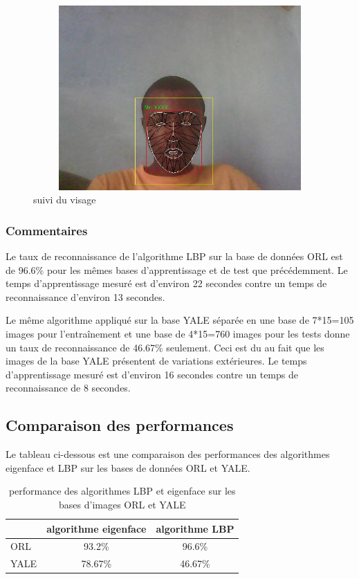 \begin{enumerate}
	\begin{figure}[htbp]
		\centering
			\includegraphics[width=350pt,height=200pt]{track3.JPG}
		\caption{suivi du visage}
		\label{fig:track 1}
	\end{figure}
	\end{enumerate}
	
	
	
		\subsubsection{Commentaires}
	Le taux de reconnaissance de l'algorithme LBP sur la base de données ORL est de 96.6\% pour les mêmes bases d'apprentissage et de test que précédemment. Le temps d'apprentissage mesuré est d'environ 22 secondes contre un temps de reconnaissance d'environ 13 secondes. 
	
	Le même algorithme appliqué sur la base YALE séparée en une base de 7*15=105 images pour l'entraînement et une base de 4*15=760 images pour les tests donne un taux de reconnaissance de 46.67\% seulement. Ceci est du au fait que les images de la base YALE présentent de variations extérieures. Le temps d'apprentissage mesuré est d'environ 16 secondes contre un temps de reconnaissance de 8 secondes. 
	\subsection{Comparaison des performances}
	Le tableau ci-dessous est une comparaison des performances des algorithmes eigenface et LBP sur les bases de données ORL et YALE.
	
	\begin{table}[htbp]
		\centering
			\begin{tabular}{|l|c|c |}
				\hline &algorithme eigenface& algorithme LBP\\
				\hline ORL  & 93.2\%& 96.6\%\\
				\hline YALE & 78.67\%& 46.67\%\\
				\hline
			\end{tabular}
		\caption{performance des algorithmes LBP et eigenface sur les bases d'images ORL et YALE}
		\label{tab:performanceDesAlgorithmesLBPEtEigenfaceSurLesBasesDImagesORLEtYALE}
	\end{table}
